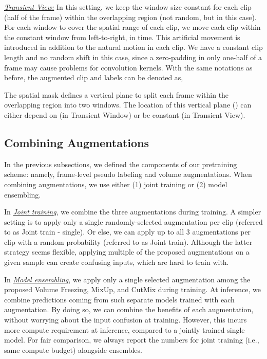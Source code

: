 \documentclass[letterpaper]{article} \usepackage{aaai23}  \usepackage{times}  \usepackage{helvet}  \usepackage{courier}  \usepackage[hyphens]{url}  \usepackage{graphicx} \urlstyle{rm} \def\UrlFont{\rm}  \usepackage{natbib}  \usepackage{caption} \frenchspacing  \setlength{\pdfpagewidth}{8.5in}  \setlength{\pdfpageheight}{11in}  \usepackage{algorithm}
\newcommand{\ch}{}
\begin{document}
\vspace{2mm}
\noindent\textit{\underline{Transient View:}} In this setting, we keep the window size constant for each clip (half of the frame) within the overlapping region (not random, but  in this case). For each window to cover the spatial range of each clip, we move each clip within the constant window from left-to-right, in time. This artificial movement is introduced in addition to the natural motion in each clip. We have a constant clip length and no random shift in this case, since a zero-padding in only one-half of a frame may cause problems for convolution kernels. With the same notations as before, the augmented clip and labels can be denoted as,
{\small

}

\ch{The spatial mask  defines a vertical plane to split each frame within the overlapping region into two windows. The location of this vertical plane () can either depend on  (in Transient Window) or be constant (in Transient View).}



\subsection{Combining Augmentations}
\label{combineAug}

In the previous subsections, we defined the components of our pretraining scheme: namely, frame-level pseudo labeling and volume augmentations. 
When combining augmentations, we use either (1) joint training or (2) model ensembling. 

\vspace{2mm}
\noindent In \textit{\underline{Joint training}}, we combine the three augmentations during training. \ch{A simpler setting is to apply only a single randomly-selected augmentation per clip (referred to as Joint train - single). Or else, we can apply up to all 3 augmentations per clip with a random probability (referred to as Joint train).} Although the latter strategy seems flexible, applying multiple of the proposed augmentations on a given sample can create confusing inputs, which are hard to train with. 

\vspace{2mm}
\noindent In \textit{\underline{Model ensembling}}, we apply only a single selected augmentation among the proposed Volume Freezing, MixUp, and CutMix during training. At inference, we combine predictions coming from such separate models trained with each augmentation. By doing so, we can combine the benefits of each augmentation, without worrying about the input confusion at training. However, this incurs more compute requirement at inference, compared to a jointly trained single model. \ch{For fair comparison, we always report the numbers for joint training (i.e., same compute budget) alongside ensembles.}
\end{document}
